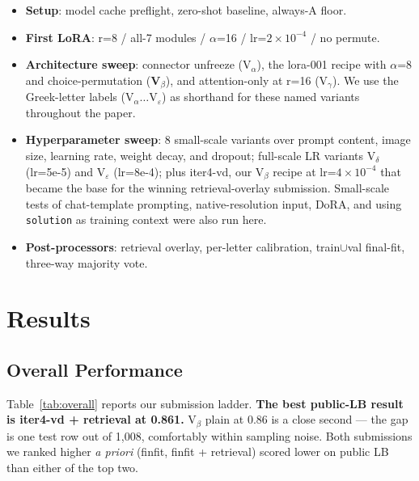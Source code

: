 \documentclass[11pt]{article}
\begin{document}
\begin{itemize}
  \item \textbf{Setup}: model cache preflight, zero-shot baseline, always-A floor.
  \item \textbf{First LoRA}: r=8 / all-7 modules / $\alpha$=16 / lr=$2\!\times\!10^{-4}$ / no permute.
  \item \textbf{Architecture sweep}: connector unfreeze (V$_\alpha$), the lora-001 recipe with $\alpha$=8 and choice-permutation (\textbf{V$_\beta$}), and attention-only at r=16 (V$_\gamma$). We use the Greek-letter labels (V$_\alpha \ldots$V$_\varepsilon$) as shorthand for these named variants throughout the paper.
  \item \textbf{Hyperparameter sweep}: 8 small-scale variants over prompt content, image size, learning rate, weight decay, and dropout; full-scale LR variants V$_\delta$ (lr=5e-5) and V$_\varepsilon$ (lr=8e-4); plus iter4-vd, our V$_\beta$ recipe at lr=$4\!\times\!10^{-4}$ that became the base for the winning retrieval-overlay submission. Small-scale tests of chat-template prompting, native-resolution input, DoRA, and using \texttt{solution} as training context were also run here.
  \item \textbf{Post-processors}: retrieval overlay, per-letter calibration, train$\cup$val final-fit, three-way majority vote.
\end{itemize}

\section{Results}

\subsection{Overall Performance}

Table~\ref{tab:overall} reports our submission ladder. \textbf{The best public-LB result is iter4-vd + retrieval at 0.861.} V$_\beta$ plain at 0.86 is a close second --- the gap is one test row out of 1{,}008, comfortably within sampling noise. Both submissions we ranked higher \emph{a priori} (finfit, finfit + retrieval) scored lower on public LB than either of the top two.
\end{document}
